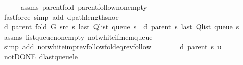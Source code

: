 \begin{isabellebody}
\ \ \ \ \isamarkupfalse%
\ assms{\isacharparenleft}{\kern0pt}{}{\isacharparenright}{\kern0pt}\ parent{\isacharunderscore}{\kern0pt}fold\ parent{\isachardot}{\kern0pt}follow{\isacharunderscore}{\kern0pt}non{\isacharunderscore}{\kern0pt}empty\isanewline
\ \ \ \ \isamarkupfalse%
\ {\isacharparenleft}{\kern0pt}fastforce\ simp\ add{\isacharcolon}{\kern0pt}\ dpath{\isacharunderscore}{\kern0pt}length{\isacharunderscore}{\kern0pt}snoc{\isacharparenright}{\kern0pt}\isanewline
\isanewline
\ \ \isamarkupfalse%
\ {\isachardoublequoteopen}d\ {\isacharparenleft}{\kern0pt}parent\ {\isacharparenleft}{\kern0pt}fold\ G\ src\ s{\isacharparenright}{\kern0pt}{\isacharparenright}{\kern0pt}\ {\isacharparenleft}{\kern0pt}last\ {\isacharparenleft}{\kern0pt}Q{\isacharunderscore}{\kern0pt}list\ {\isacharparenleft}{\kern0pt}queue\ s{\isacharparenright}{\kern0pt}{\isacharparenright}{\kern0pt}{\isacharparenright}{\kern0pt}\ {\isacharequal}{\kern0pt}\ d\ {\isacharparenleft}{\kern0pt}parent\ s{\isacharparenright}{\kern0pt}\ {\isacharparenleft}{\kern0pt}last\ {\isacharparenleft}{\kern0pt}Q{\isacharunderscore}{\kern0pt}list\ {\isacharparenleft}{\kern0pt}queue\ s{\isacharparenright}{\kern0pt}{\isacharparenright}{\kern0pt}{\isacharparenright}{\kern0pt}{\isachardoublequoteclose}\isanewline
\ \ \ \ \isamarkupfalse%
\ assms\ list{\isacharunderscore}{\kern0pt}queue{\isacharunderscore}{\kern0pt}non{\isacharunderscore}{\kern0pt}empty\ not{\isacharunderscore}{\kern0pt}white{\isacharunderscore}{\kern0pt}if{\isacharunderscore}{\kern0pt}mem{\isacharunderscore}{\kern0pt}queue\isanewline
\ \ \ \ \isamarkupfalse%
\ {\isacharparenleft}{\kern0pt}simp\ add{\isacharcolon}{\kern0pt}\ not{\isacharunderscore}{\kern0pt}white{\isacharunderscore}{\kern0pt}imp{\isacharunderscore}{\kern0pt}rev{\isacharunderscore}{\kern0pt}follow{\isacharunderscore}{\kern0pt}fold{\isacharunderscore}{\kern0pt}eq{\isacharunderscore}{\kern0pt}rev{\isacharunderscore}{\kern0pt}follow{\isacharparenright}{\kern0pt}\isanewline
\ \ \isamarkupfalse%
\ \isamarkupfalse%
\ {\isachardoublequoteopen}{\isachardot}{\kern0pt}{\isachardot}{\kern0pt}{\isachardot}{\kern0pt}\ {\isasymle}\ d\ {\isacharparenleft}{\kern0pt}parent\ s{\isacharparenright}{\kern0pt}\ {\isacharquery}{\kern0pt}u\ {\isacharplus}{\kern0pt}\ {}{\isachardoublequoteclose}\isanewline
\ \ \ \ \isamarkupfalse%
\ not{\isacharunderscore}{\kern0pt}DONE\ d{\isacharunderscore}{\kern0pt}last{\isacharunderscore}{\kern0pt}queue{\isacharunderscore}{\kern0pt}le\isanewline

\end{isabellebody}
